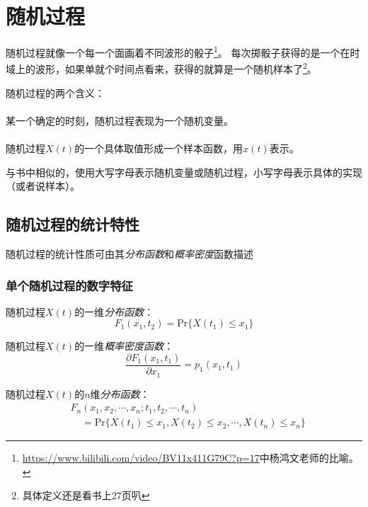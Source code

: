 \section{随机过程}
    随机过程就像一个每一个面画着不同波形的骰子\footnote{\url{https://www.bilibili.com/video/BV11x411G79C?p=17}中杨鸿文老师的比喻。}。
    每次掷骰子获得的是一个在时域上的波形，如果单就个时间点看来，获得的就算是一个随机样本了\footnote{具体定义还是看书上27页叭}。

    随机过程的两个含义：
    \vspace{-2ex}
    \paragraph{}某一个确定的时刻，随机过程表现为一个随机变量。
    \vspace{-2ex}
    \paragraph{}随机过程$X(t)$的一个具体取值形成一个样本函数，用$x(t)$表示。
    \vspace{1ex}

    与书中相似的，使用大写字母表示随机变量或随机过程，小写字母表示具体的实现（或者说样本）。

\subsection{随机过程的统计特性}
    随机过程的统计性质可由其\emph{分布函数}和\emph{概率密度}函数描述

    \subsubsection{单个随机过程的数字特征}

    随机过程$X(t)$的一维\emph{分布函数}：
    \begin{equation}
        F_1(x_1,t_2)=\text{Pr}\{X(t_1)\leq x_1\}
    \end{equation}

    随机过程$X(t)$的一维\emph{概率密度函数}：
    \begin{equation}
        \frac{\partial F_1(x_1,t_1)}{\partial x_1}=p_1(x_1,t_1)
    \end{equation}

    随机过程$X(t)$的$n$维\emph{分布函数}：
    \begin{equation}
        \begin{split}
            &F_n(x_1,x_2,\cdots,x_n;t_1,t_2,\cdots,t_n)\\
            &\phantom{F_n}=\text{Pr}\{X(t_1)\leq x_1,X(t_2)\leq x_2,\cdots ,X(t_n)\leq x_n\}
        \end{split}
    \end{equation}

